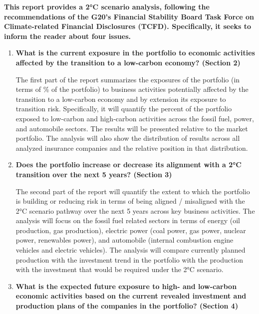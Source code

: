 \documentclass[10pt,table,a4]{article}\usepackage[]{graphicx}\usepackage[]{color}
\begin{document}
	\begin{multicols}{2}
		
		\textbf{This report provides a 2°C scenario analysis, following the recommendations of the G20's Financial Stability Board Task Force on Climate-related Financial Disclosures (TCFD). Specifically, it seeks to inform the reader about four issues.}
		
		\begin{enumerate}
			\item{\textbf{ What is the current exposure in the portfolio to economic activities affected by the transition to a low-carbon economy? (Section 2) }
			}
			
			The first part of the report summarizes the exposures of the portfolio (in terms of \% of the portfolio) to business activities potentially affected by the transition to a low-carbon economy and by extension its exposure to transition risk. Specifically, it will quantify the percent of the portfolio exposed to low-carbon and high-carbon activities across the fossil fuel, power, and automobile sectors. The results will be presented relative to the market portfolio. The analysis will also show the distribution of results across all analyzed insurance companies and the relative position in that distribution. 
			
			\item{\textbf{Does the portfolio increase or decrease its alignment with a 2°C transition over the next 5 years? (Section 3)}
			}
			
			The second part of the report will quantify the extent to which the portfolio is building or reducing risk in terms of being aligned / misaligned with the 2°C scenario pathway over the next 5 years across key business activities. The analysis will focus on the fossil fuel related sectors in terms of energy (oil production, gas production), electric power (coal power, gas power, nuclear power, renewables power), and automobile (internal combustion engine vehicles and electric vehicles). The analysis will compare currently planned production with the investment trend in the portfolio with the production with the investment that would be required under the 2°C scenario. 
			
			\item{\textbf{ What is the expected future exposure to high- and low-carbon economic activities based on the current revealed investment and production plans of the companies in the portfolio? (Section 4)}
			}
			

\end{enumerate}
\end{multicols}
\end{document}
